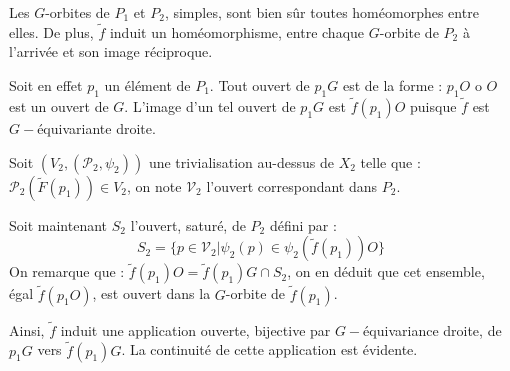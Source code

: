 \begin{rema}%
Les $G$-orbites de $P_1$ et $P_2$, simples, sont bien sûr toutes hom\'eomorphes entre elles. %
De plus, $\tilde{f}$ induit un hom\'eomorphisme, entre chaque $G$-orbite de $P_2$ à l'arrivée et son image réciproque.

\par
Soit en effet $p_1$ un élément de $P_1$. Tout ouvert de $p_1G$ est de la forme : $p_1O$ o $O$ est un ouvert de $G$. %
L'image d'un tel ouvert de $p_1G$ est $\tilde{f}(p_1)O$ puisque $\tilde{f}$ est $G-$\'equivariante  droite.

\par
Soit $(V_2,(\mathcal{P}_2,\psi_2))$ une trivialisation au-dessus de $X_2$ telle que : $\mathcal{P}_2(\tilde{F}(p_1)) \in V_2$, %
on note $\mathcal{V}_2$ l'ouvert correspondant dans $P_2$.

\begin{comment}
Comme $\tilde{f}$ est continue l'image réciproque de $\mathcal{V}_2$ par cette application est un ouvert de $P_1$, satur\'e comme $\tilde{f}$ est $G$-équivariante. %
Comme l'ensemble des ouverts de trivialisation au-dessus de $X_1$ est une base il existe une trivialisation $(V_1,(\mathcal{P}_1,\psi_1))$ au-dessus de $X_1$, %
telle que $p_1$ soit contenu dans l'image réciproque $\mathcal{V}_1$, de $V_1$ par $\mathcal{P}$.

\par
On remarque que $\mathcal{V}_1$ est envoyé de manière $G$-\'equivariante à droite, non nécessairement ouverte, dans $\mathcal{V}_2$. %
Comme $\tilde{f}$ est $G$-équivariante à droite, la section :
\[\{p \in \mathcal{V}_1 | \psi_1(p) \in \psi_1(p_1)O\}\]
de l'ouvert de trivialisation $\mathcal{V}_1$ est envoyée, de manière non nécessairement ouverte ni surjective, vers :
\[\{p \in \mathcal{V}_2 | \psi_2(p) \in \psi_2(\tilde{f}(p_1))O\}\]
dans $\mathcal{V}_2$, nous notons $S_2$ ce dernier ensemble, ouvert dans $P_2$.
\end{comment}

\par
Soit maintenant $S_2$ l'ouvert, satur\'e, de $P_2$ d\'efini par :
\[S_2=\{p \in \mathcal{V}_2 | \psi_2(p) \in \psi_2(\tilde{f}(p_1))O\}\]
On remarque que : $\tilde{f}(p_1) O = \tilde{f}(p_1) G \cap S_2$, on en d\'eduit que cet ensemble, \'egal  $\tilde{f}(p_1O)$, est ouvert dans la $G$-orbite de $\tilde{f}(p_1)$.

\par
Ainsi, $\tilde{f}$ induit une application ouverte, bijective par $G-$\'equivariance  droite, de $p_1G$ vers $\tilde{f}(p_1)G$. La continuit\'e de cette application est \'evidente.
\end{rema}

